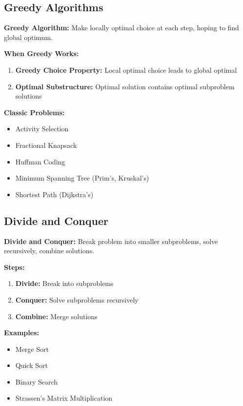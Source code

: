 \documentclass[11pt,a4paper]{article}
\begin{document}
\subsection{Greedy Algorithms}

\begin{defbox}
\textbf{Greedy Algorithm:} Make locally optimal choice at each step, hoping to find global optimum.
\end{defbox}

\textbf{When Greedy Works:}
\begin{enumerate}
    \item \textbf{Greedy Choice Property:} Local optimal choice leads to global optimal
    \item \textbf{Optimal Substructure:} Optimal solution contains optimal subproblem solutions
\end{enumerate}

\textbf{Classic Problems:}
\begin{itemize}
    \item Activity Selection
    \item Fractional Knapsack
    \item Huffman Coding
    \item Minimum Spanning Tree (Prim's, Kruskal's)
    \item Shortest Path (Dijkstra's)
\end{itemize}

\subsection{Divide and Conquer}

\begin{defbox}
\textbf{Divide and Conquer:} Break problem into smaller subproblems, solve recursively, combine solutions.
\end{defbox}

\textbf{Steps:}
\begin{enumerate}
    \item \textbf{Divide:} Break into subproblems
    \item \textbf{Conquer:} Solve subproblems recursively
    \item \textbf{Combine:} Merge solutions
\end{enumerate}

\textbf{Examples:}
\begin{itemize}
    \item Merge Sort
    \item Quick Sort
    \item Binary Search
    \item Strassen's Matrix Multiplication
\end{itemize}
\end{document}
